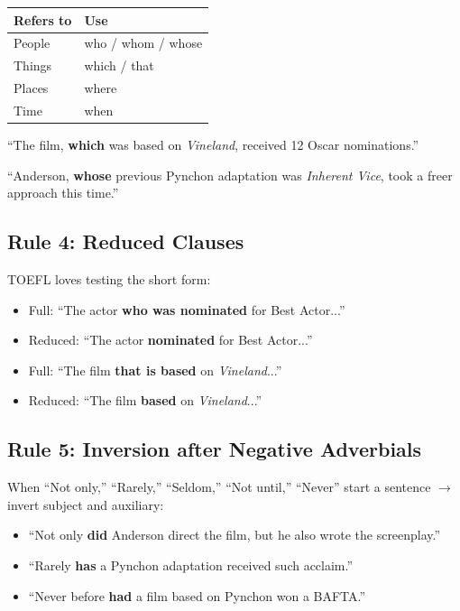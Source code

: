 \documentclass[10pt,a4paper]{article}
\begin{document}
\begin{center}
\begin{tabular}{ll}
\toprule
\textbf{Refers to} & \textbf{Use} \\
\midrule
People & who / whom / whose \\
Things & which / that \\
Places & where \\
Time & when \\
\bottomrule
\end{tabular}
\end{center}

``The film, \textbf{which} was based on \emph{Vineland}, received
12 Oscar nominations.''

``Anderson, \textbf{whose} previous Pynchon adaptation was
\emph{Inherent Vice}, took a freer approach this time.''

\subsection*{Rule 4: Reduced Clauses}

TOEFL loves testing the short form:
\begin{itemize}[nosep]
\item Full: ``The actor \textbf{who was nominated} for Best Actor...''
\item Reduced: ``The actor \textbf{nominated} for Best Actor...''
\item Full: ``The film \textbf{that is based} on \emph{Vineland}...''
\item Reduced: ``The film \textbf{based} on \emph{Vineland}...''
\end{itemize}

\subsection*{Rule 5: Inversion after Negative Adverbials}

When ``Not only,'' ``Rarely,'' ``Seldom,'' ``Not until,'' ``Never''
start a sentence $\to$ invert subject and auxiliary:

\begin{itemize}[nosep]
\item ``Not only \textbf{did} Anderson direct the film, but he also
wrote the screenplay.''
\item ``Rarely \textbf{has} a Pynchon adaptation received such acclaim.''
\item ``Never before \textbf{had} a film based on Pynchon won a BAFTA.''
\end{itemize}
\end{document}
